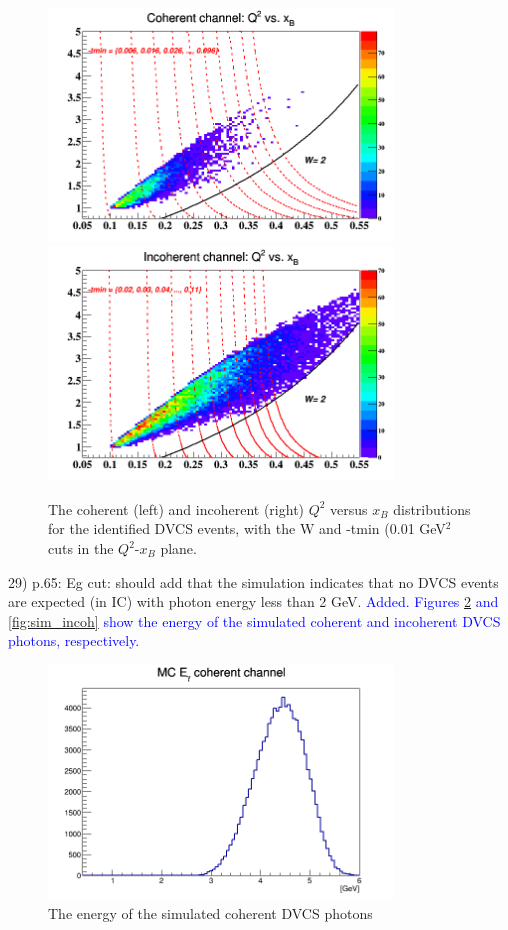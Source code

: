\begin{figure}[h!]
\includegraphics[height=6.2cm]{fig/coh_Q2_xB.png}
\includegraphics[height=6.2cm]{fig/incoh_Q2_xB.png}
\caption{The coherent (left) and incoherent (right) $Q^{2}$ versus $x_{B}$ 
   distributions for the identified DVCS events, with the W and -tmin (0.01 
GeV$^{2}$ cuts in the $Q^{2}$-$x_{B}$ plane.}
\label{fig:Q2_xB}
 \end{figure}


29) p.65: Eg cut: should add that the simulation indicates that no DVCS events 
are expected (in IC) with photon energy less than 2 GeV.
\textcolor{blue}{ Added. Figures \ref{fig:sim_coh} and \ref{fig:sim_incoh} show 
the energy of the simulated coherent and incoherent DVCS photons, respectively.  
}\\

\begin{figure}[h!]
\centering
\includegraphics[height=6.2cm]{fig/photon_energy_coh_sim.png}
\caption{The energy of the simulated coherent DVCS photons}
\label{fig:sim_coh}
 \end{figure}

